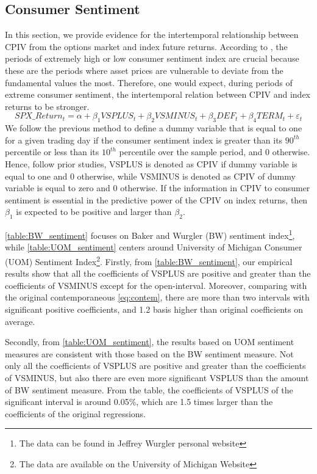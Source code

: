 
\subsection{Consumer Sentiment}
In this section, we provide evidence for the intertemporal relationship between CPIV from the options market and index future returns. 
According to \textcite{atilgan2015implied}, the periods of extremely high or low consumer sentiment index are crucial because these are the periods where asset prices are vulnerable to deviate from the fundamental values the most. Therefore, one would expect, during periods of extreme consumer sentiment, the intertemporal relation between CPIV and index returns to be stronger.
 \begin{equation}  \label{eq:info}
SPX\_Return_{t} = \alpha + \beta _{1}VSPLUS_{t} + \beta _{2}VSMINUS_{t} + \beta _{3}DEF_{t} + \beta _{4}TERM_{t} + \varepsilon _{t}
 \end{equation}
We follow the previous method to define a dummy variable that is equal to one for a given trading day if the consumer sentiment index is greater than its $90^{th}$ percentile or less than its $10^{th}$ percentile over the sample period, and 0 otherwise. Hence, follow prior studies, VSPLUS is denoted as CPIV if dummy variable is equal to one and 0 otherwise, while VSMINUS is denoted as CPIV of dummy variable is equal to zero and 0 otherwise. If the information in CPIV to consumer sentiment is essential in the predictive power of the CPIV on index returns, then $\beta _{1}$ is expected to be positive and larger than $\beta _{2}$. 

\autoref{table:BW_sentiment} focuses on Baker and Wurgler (BW) sentiment index\footnote{The data can be found in Jeffrey Wurgler personal website}, while \autoref{table:UOM_sentiment} centers around University of Michigan Consumer (UOM) Sentiment Index\footnote{The data are available on the University of Michigan Website}. Firstly, from \autoref{table:BW_sentiment}, our empirical results show that all the coefficients of VSPLUS are positive and greater than the coefficients of VSMINUS except for the open-interval. Moreover, comparing with the original contemporaneous \autoref{eq:contem}, there are more than two intervals with significant positive coefficients, and 1.2 basis higher than original coefficients on average. 

Secondly, from \autoref{table:UOM_sentiment}, the results based on UOM sentiment measures are consistent with those based on the BW sentiment measure. Not only all the coefficients of VSPLUS are positive and greater than the coefficients of VSMINUS, but also there are even more significant VSPLUS than the amount of BW sentiment measure. From the table, the coefficients of VSPLUS of the significant interval is around 0.05\%, which are 1.5 times larger than the coefficients of the original regressions. 

